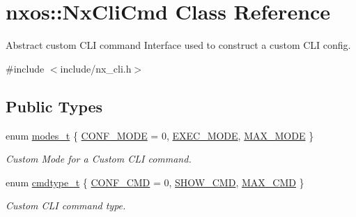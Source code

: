 \hypertarget{classnxos_1_1_nx_cli_cmd}{}\section{nxos\+:\+:Nx\+Cli\+Cmd Class Reference}
\label{classnxos_1_1_nx_cli_cmd}


Abstract custom C\+LI command Interface used to construct a custom C\+LI config.  




{\ttfamily \#include $<$include/nx\+\_\+cli.\+h$>$}

\subsection*{Public Types}
\begin{DoxyCompactItemize}
\item 
enum \mbox{\hyperlink{classnxos_1_1_nx_cli_cmd_a72999b2e8f2995bbb19be346d875e3ce}{modes\+\_\+t}} \{ \mbox{\hyperlink{classnxos_1_1_nx_cli_cmd_a72999b2e8f2995bbb19be346d875e3cea5f01458d92031d6ca875f201bd8d0bb1}{C\+O\+N\+F\+\_\+\+M\+O\+DE}} = 0, 
\mbox{\hyperlink{classnxos_1_1_nx_cli_cmd_a72999b2e8f2995bbb19be346d875e3cea9213e9b4feb7ead0d2333bc83bfc5cdb}{E\+X\+E\+C\+\_\+\+M\+O\+DE}}, 
\mbox{\hyperlink{classnxos_1_1_nx_cli_cmd_a72999b2e8f2995bbb19be346d875e3ceaedb25d06f68762ba3a8c8bc831a14c6f}{M\+A\+X\+\_\+\+M\+O\+DE}}
 \}
\begin{DoxyCompactList}\small\item\em Custom Mode for a Custom C\+LI command. \end{DoxyCompactList}\item 
enum \mbox{\hyperlink{classnxos_1_1_nx_cli_cmd_a82ed104f13c7859b24d3c0527f706be1}{cmdtype\+\_\+t}} \{ \mbox{\hyperlink{classnxos_1_1_nx_cli_cmd_a82ed104f13c7859b24d3c0527f706be1a95032ccdb393e24e4a57a330b3ba3142}{C\+O\+N\+F\+\_\+\+C\+MD}} = 0, 
\mbox{\hyperlink{classnxos_1_1_nx_cli_cmd_a82ed104f13c7859b24d3c0527f706be1a07e42d83caddae06870cbf324da56bbe}{S\+H\+O\+W\+\_\+\+C\+MD}}, 
\mbox{\hyperlink{classnxos_1_1_nx_cli_cmd_a82ed104f13c7859b24d3c0527f706be1a09e26af6ee427940926af9bd7ef2e73d}{M\+A\+X\+\_\+\+C\+MD}}
 \}
\begin{DoxyCompactList}\small\item\em Custom C\+LI command type. \end{DoxyCompactList}\end{DoxyCompactItemize}
